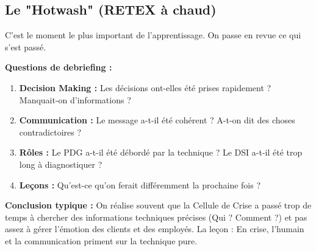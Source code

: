 \subsection{Le "Hotwash" (RETEX à chaud)}

C'est le moment le plus important de l'apprentissage. On passe en revue ce qui s'est passé.

\textbf{Questions de debriefing :}
\begin{enumerate}
    \item \textbf{Decision Making :} Les décisions ont-elles été prises rapidement ? Manquait-on d'informations ?
    \item \textbf{Communication :} Le message a-t-il été cohérent ? A-t-on dit des choses contradictoires ?
    \item \textbf{Rôles :} Le PDG a-t-il été débordé par la technique ? Le DSI a-t-il été trop long à diagnostiquer ?
    \item \textbf{Leçons :} Qu'est-ce qu'on ferait différemment la prochaine fois ?
\end{enumerate}

\begin{boxalert}
\textbf{Conclusion typique :} On réalise souvent que la Cellule de Crise a passé trop de temps à chercher des informations techniques précises (Qui ? Comment ?) et pas assez à gérer l'émotion des clients et des employés. La leçon : En crise, l'humain et la communication priment sur la technique pure.
\end{boxalert}

